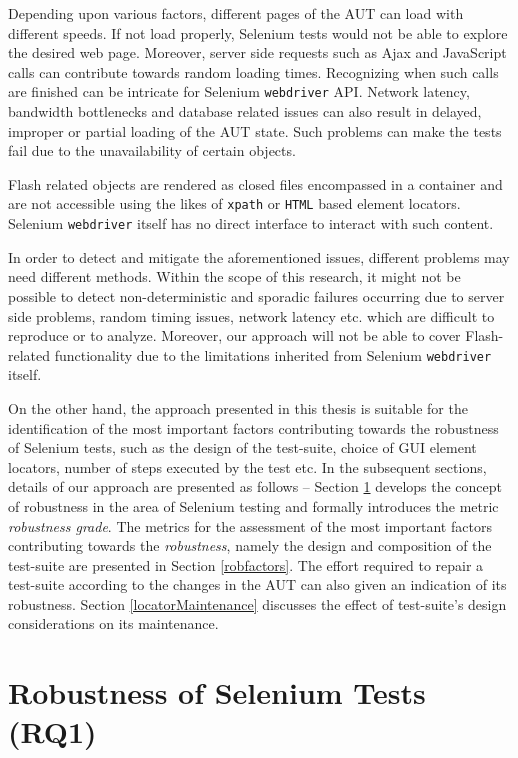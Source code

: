 Depending upon various factors, different pages of the AUT can load with different speeds. If not load properly, Selenium tests would not be able to explore the desired web page. Moreover, server side requests such as Ajax and JavaScript calls can contribute towards random loading times. Recognizing when such calls are finished can be intricate for Selenium \texttt{webdriver} API. Network latency, bandwidth bottlenecks and database related issues can also result in delayed, improper or partial loading of the AUT state. Such problems can make the tests fail due to the unavailability of certain objects.

Flash related objects are rendered as closed files encompassed in a container and are not accessible using the likes of \texttt{xpath} or \texttt{HTML} based element locators. Selenium \texttt{webdriver} itself has no direct interface to interact with such content. 

In order to detect and mitigate the aforementioned issues, different problems may need different methods. Within the scope of this research, it might not be possible to detect non-deterministic and sporadic failures occurring due to server side problems, random timing issues, network latency etc. which are difficult to reproduce or to analyze. Moreover, our approach will not be able to cover Flash-related functionality due to the limitations inherited from Selenium \texttt{webdriver} itself.

On the other hand, the approach presented in this thesis is suitable for the identification of the most important factors contributing towards the robustness of Selenium tests, such as the design of the test-suite, choice of GUI element locators, number of steps executed by the test etc. In the subsequent sections, details of our approach are presented as follows -- Section \ref{robustnessOfSeleniumTests} develops the concept of robustness in the area of Selenium testing and formally introduces the metric \textit{robustness grade}. The metrics for the assessment of the most important factors contributing towards the \textit{robustness}, namely the design and composition of the test-suite are presented in Section \ref{robfactors}. The effort required to repair a test-suite according to the changes in the AUT can also given an indication of its robustness. Section \ref{locatorMaintenance} discusses the effect of test-suite's design considerations on its maintenance. 

\section{Robustness of Selenium Tests (RQ1)}
\label{robustnessOfSeleniumTests}

